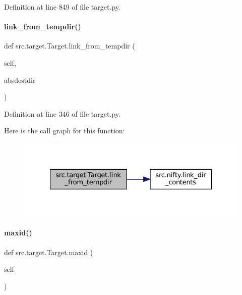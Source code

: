 Definition at line 849 of file target.\+py.

\mbox{\label{classsrc_1_1target_1_1Target_a558b52b23367b475a553567cd3ab5a8f}} 
\paragraph{\texorpdfstring{link\+\_\+from\+\_\+tempdir()}{link\_from\_tempdir()}}
{\footnotesize\ttfamily def src.\+target.\+Target.\+link\+\_\+from\+\_\+tempdir (\begin{DoxyParamCaption}\item[{}]{self,  }\item[{}]{absdestdir }\end{DoxyParamCaption})\hspace{0.3cm}{\ttfamily [inherited]}}



Definition at line 346 of file target.\+py.

Here is the call graph for this function\+:
\nopagebreak
\begin{figure}[H]
\begin{center}
\leavevmode
\includegraphics[width=327pt]{classsrc_1_1target_1_1Target_a558b52b23367b475a553567cd3ab5a8f_cgraph}
\end{center}
\end{figure}
\mbox{\label{classsrc_1_1target_1_1Target_a9517cd2799579d5fa5aa407fc79fff44}} 
\paragraph{\texorpdfstring{maxid()}{maxid()}}
{\footnotesize\ttfamily def src.\+target.\+Target.\+maxid (\begin{DoxyParamCaption}\item[{}]{self }\end{DoxyParamCaption})\hspace{0.3cm}{\ttfamily [inherited]}}



